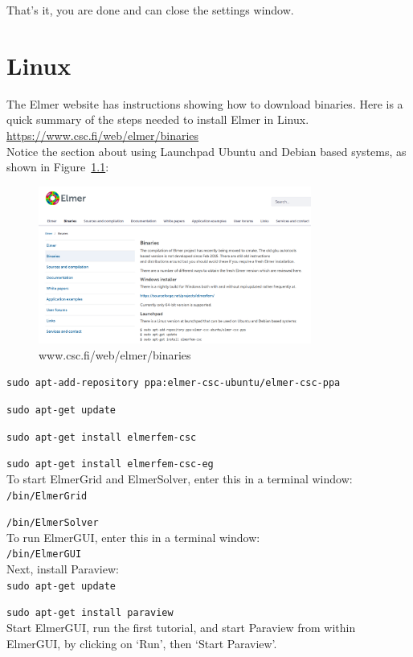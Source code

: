That's it, you are done and can close the settings window.

\chapter{Linux}

The Elmer website has instructions showing how to download binaries.  Here is a quick summary of the steps needed to install Elmer in Linux.\\

 \url{https://www.csc.fi/web/elmer/binaries}\\

Notice the section about using Launchpad Ubuntu and Debian based systems, as shown in Figure~\ref{fg:binaries}:\\

\begin{figure}[H]
\begin{center}
\includegraphics[width=0.8\textwidth]{binaries}
\caption{www.csc.fi/web/elmer/binaries}\label{fg:binaries}
\end{center}
\end{figure}


\texttt{sudo apt-add-repository ppa:elmer-csc-ubuntu/elmer-csc-ppa}

\texttt{sudo apt-get update}

\texttt{sudo apt-get install elmerfem-csc}

\texttt{sudo apt-get install elmerfem-csc-eg}\\

To start ElmerGrid and ElmerSolver, enter this in a terminal window:\\

\texttt{/bin/ElmerGrid}

\texttt{/bin/ElmerSolver}\\

To run ElmerGUI, enter this in a terminal window:\\

\texttt{/bin/ElmerGUI}\\

Next, install Paraview:\\

\texttt{sudo apt-get update}

\texttt{sudo apt-get install paraview}\\

Start ElmerGUI, run the first tutorial, and start Paraview from within ElmerGUI, by clicking on `Run', then `Start Paraview'.










